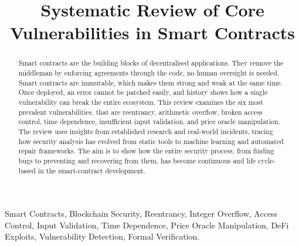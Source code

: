 \documentclass[conference]{IEEEtran}
\begin{document}
\title{Systematic Review of Core Vulnerabilities in Smart Contracts\\}

\author{

\and
{}
}

\maketitle

\begin{abstract}
Smart contracts are the building blocks of decentralised applications. They remove the middleman by enforcing agreements through the code, no human oversight is needed. Smart contracts are immutable, which makes them strong and weak at the same time. Once deployed, an error cannot be patched easily, and history shows how a single vulnerability can break the entire ecosystem. This review examines the six most prevalent vulnerabilities, that are reentrancy, arithmetic overflow, broken access control, time dependence, insufficient input validation, and price oracle manipulation. The review uses insights from established research and real-world incidents, tracing how security analysis has evolved from static tools to machine learning and automated repair frameworks. The aim is to show how the entire security process, from finding bugs to preventing and recovering from them, has become continuous and life cycle-based in the smart-contract development.
\end{abstract}
\vspace{1em} %

\renewcommand\IEEEkeywordsname{Keywords}
\begin{IEEEkeywords}
Smart Contracts, Blockchain Security, Reentrancy, Integer Overflow, Access Control, Input Validation, Time Dependence, Price Oracle Manipulation, DeFi Exploits, Vulnerability Detection, Formal Verification.
\end{IEEEkeywords}
\end{document}
